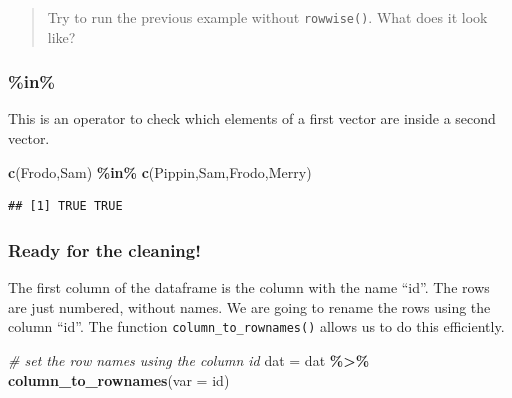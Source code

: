 \documentclass[
]{book}
\newenvironment{Shaded}{\begin{snugshade}}{\end{snugshade}}
\newcommand{\AttributeTok}[1]{\textcolor[rgb]{0.13,0.29,0.53}{#1}}
\newcommand{\CommentTok}[1]{\textcolor[rgb]{0.56,0.35,0.01}{\textit{#1}}}
\newcommand{\FunctionTok}[1]{\textcolor[rgb]{0.13,0.29,0.53}{\textbf{#1}}}
\newcommand{\NormalTok}[1]{#1}
\newcommand{\OtherTok}[1]{\textcolor[rgb]{0.56,0.35,0.01}{#1}}
\newcommand{\SpecialCharTok}[1]{\textcolor[rgb]{0.81,0.36,0.00}{\textbf{#1}}}
\newcommand{\StringTok}[1]{\textcolor[rgb]{0.31,0.60,0.02}{#1}}
\begin{document}
\begin{quote}
Try to run the previous example without \texttt{rowwise()}. What does it look like?
\end{quote}

\hypertarget{in}{%
\subsubsection{\%in\%}\label{in}}

This is an operator to check which elements of a first vector are inside a second vector.

\begin{Shaded}
\begin{Highlighting}[]
\FunctionTok{c}\NormalTok{(}\StringTok{\textquotesingle{}Frodo\textquotesingle{}}\NormalTok{,}\StringTok{\textquotesingle{}Sam\textquotesingle{}}\NormalTok{) }\SpecialCharTok{\%in\%} \FunctionTok{c}\NormalTok{(}\StringTok{\textquotesingle{}Pippin\textquotesingle{}}\NormalTok{,}\StringTok{\textquotesingle{}Sam\textquotesingle{}}\NormalTok{,}\StringTok{\textquotesingle{}Frodo\textquotesingle{}}\NormalTok{,}\StringTok{\textquotesingle{}Merry\textquotesingle{}}\NormalTok{)}
\end{Highlighting}
\end{Shaded}

\begin{verbatim}
## [1] TRUE TRUE
\end{verbatim}

\hypertarget{ready-for-the-cleaning}{%
\subsubsection{Ready for the cleaning!}\label{ready-for-the-cleaning}}

The first column of the dataframe is the column with the name ``id''.
The rows are just numbered, without names.
We are going to rename the rows using the column ``id''. The function \texttt{column\_to\_rownames()} allows us to do this efficiently.

\begin{Shaded}
\begin{Highlighting}[]
\CommentTok{\# set the row names using the column id}
\NormalTok{dat }\OtherTok{=}\NormalTok{ dat }\SpecialCharTok{\%\textgreater{}\%}
  \FunctionTok{column\_to\_rownames}\NormalTok{(}\AttributeTok{var =} \StringTok{\textquotesingle{}id\textquotesingle{}}\NormalTok{)}
\end{Highlighting}
\end{Shaded}
\end{document}
